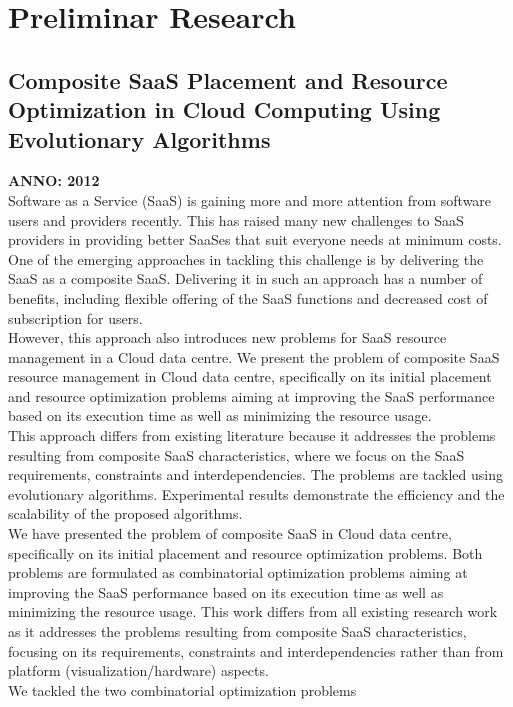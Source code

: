 \section{Preliminar Research}\label{sect:preres}

\subsection{Composite SaaS Placement and Resource Optimization in Cloud Computing Using Evolutionary Algorithms}
\textbf{ANNO: 2012}~\cite{yusoh2012composite}\\
Software as a Service (SaaS) is gaining more and more attention from software users and providers recently. 
This has raised many new challenges to SaaS providers in providing better SaaSes that suit everyone needs at minimum costs. 
One of the emerging approaches in tackling this challenge is by delivering the SaaS as a composite SaaS. 
Delivering it in such an approach has a number of benefits, including flexible offering
of the SaaS functions and decreased cost of subscription for users. \\
However, this approach also introduces new problems for SaaS resource management in a Cloud data centre. 
We present the problem of composite SaaS resource management in Cloud data centre, specifically on its initial placement and
resource optimization problems aiming at improving the SaaS performance based on its execution time as well as minimizing
the resource usage. \\
This approach differs from existing literature because it addresses the problems resulting from composite
SaaS characteristics, where we focus on the SaaS requirements, constraints and interdependencies. 
The problems are tackled using evolutionary algorithms. 
Experimental results demonstrate the efficiency and the scalability of the proposed algorithms.\\
We have presented the problem of composite SaaS in
Cloud data centre, specifically on its initial placement and
resource optimization problems. Both problems are formulated
as combinatorial optimization problems aiming at improving
the SaaS performance based on its execution time as well
as minimizing the resource usage. This work differs from
all existing research work as it addresses the problems resulting from composite SaaS characteristics, focusing on its
requirements, constraints and interdependencies rather than from platform (visualization/hardware) aspects.\\
We tackled the two combinatorial optimization problems
